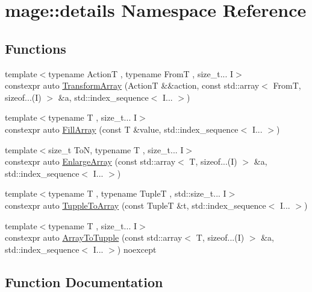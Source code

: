 \hypertarget{namespacemage_1_1details}{}\section{mage\+:\+:details Namespace Reference}
\label{namespacemage_1_1details}
\subsection*{Functions}
\begin{DoxyCompactItemize}
\item 
{\footnotesize template$<$typename ActionT , typename FromT , size\+\_\+t... I$>$ }\\constexpr auto \mbox{\hyperlink{namespacemage_1_1details_aa631b30a1b959924e27691bb8a5abfd9}{Transform\+Array}} (ActionT \&\&action, const std\+::array$<$ FromT, sizeof...(I) $>$ \&a, std\+::index\+\_\+sequence$<$ I... $>$)
\item 
{\footnotesize template$<$typename T , size\+\_\+t... I$>$ }\\constexpr auto \mbox{\hyperlink{namespacemage_1_1details_ad477b707ee51319263d0ee265497b19b}{Fill\+Array}} (const T \&value, std\+::index\+\_\+sequence$<$ I... $>$)
\item 
{\footnotesize template$<$size\+\_\+t ToN, typename T , size\+\_\+t... I$>$ }\\constexpr auto \mbox{\hyperlink{namespacemage_1_1details_ad83ea78ba7d2cd128388c1364e0d60ea}{Enlarge\+Array}} (const std\+::array$<$ T, sizeof...(I) $>$ \&a, std\+::index\+\_\+sequence$<$ I... $>$)
\item 
{\footnotesize template$<$typename T , typename TupleT , std\+::size\+\_\+t... I$>$ }\\constexpr auto \mbox{\hyperlink{namespacemage_1_1details_a08e127cc8f86571ccf6633b64be27358}{Tupple\+To\+Array}} (const TupleT \&t, std\+::index\+\_\+sequence$<$ I... $>$)
\item 
{\footnotesize template$<$typename T , size\+\_\+t... I$>$ }\\constexpr auto \mbox{\hyperlink{namespacemage_1_1details_aa543dfe931d715819c50f9a453f8910f}{Array\+To\+Tupple}} (const std\+::array$<$ T, sizeof...(I) $>$ \&a, std\+::index\+\_\+sequence$<$ I... $>$) noexcept
\end{DoxyCompactItemize}


\subsection{Function Documentation}
\mbox{\label{namespacemage_1_1details_aa543dfe931d715819c50f9a453f8910f}} 
